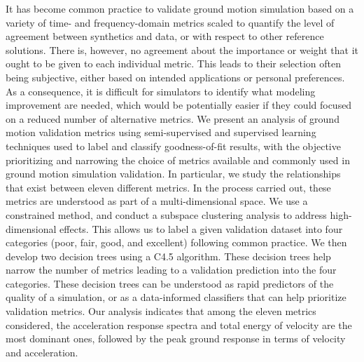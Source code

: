 % 
It has become common practice to validate ground motion simulation based on a variety of time- and frequency-domain metrics scaled to quantify the level of agreement between synthetics and data, or with respect to other reference solutions. There is, however, no agreement about the importance or weight that it ought to be given to each individual metric. This leads to their selection often being subjective, either based on intended applications or personal preferences. As a consequence, it is difficult for simulators to identify what modeling improvement are needed, which would be potentially easier if they could focused on a reduced number of alternative metrics. We present an analysis of ground motion validation metrics using semi-supervised and supervised learning techniques used to label and classify goodness-of-fit results, with the objective prioritizing and narrowing the choice of metrics available and commonly used in ground motion simulation validation. In particular, we study the relationships that exist between eleven different metrics. In the process carried out, these metrics are understood as part of a multi-dimensional space. We use a constrained \kmeans{} method, and conduct a subspace clustering analysis to address high-dimensional effects. This allows us to label a given validation dataset into four categories (poor, fair, good, and excellent) following common practice. We then develop two decision trees using a C4.5 algorithm. These decision trees help narrow the number of metrics leading to a validation prediction into the four categories. These decision trees can be understood as rapid predictors of the quality of a simulation, or as a data-informed classifiers that can help prioritize validation metrics. Our analysis indicates that among the eleven metrics considered, the acceleration response spectra and total energy of velocity are the most dominant ones, followed by the peak ground response in terms of velocity and acceleration.

